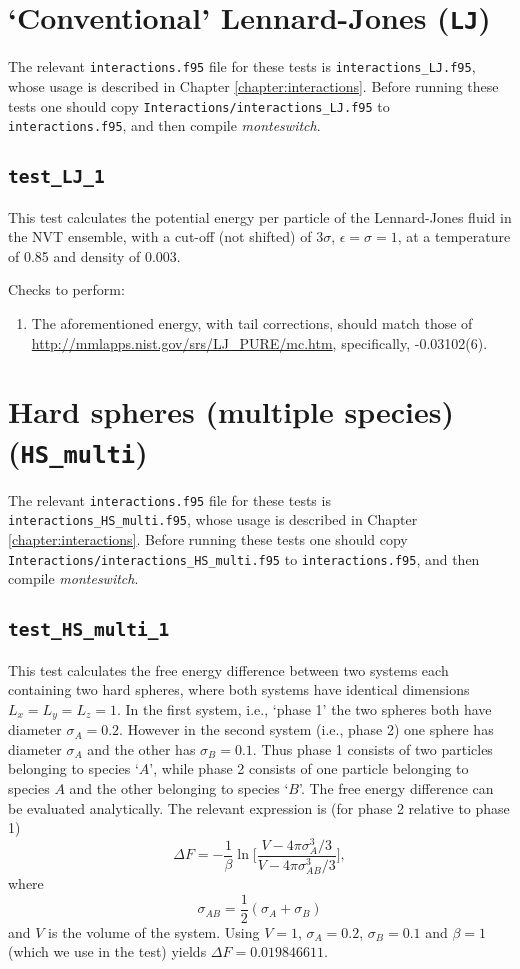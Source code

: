 \documentclass{report}
\begin{document}
\section{`Conventional' Lennard-Jones (\texttt{LJ})}
The relevant \texttt{interactions.f95} file for these tests is \texttt{interactions\_LJ.f95}, whose usage is described in Chapter
\ref{chapter:interactions}. Before running these tests one should copy \texttt{Interactions/interactions\_LJ.f95}
to \texttt{interactions.f95}, and then compile \emph{monteswitch}.


\subsection{\texttt{test\_LJ\_1}}
This test calculates the potential energy per particle of the Lennard-Jones fluid in the NVT ensemble, with a cut-off (not shifted) of
$3\sigma$, $\epsilon=\sigma=1$, at a temperature of 0.85 and density of 0.003.

Checks to perform:
\begin{enumerate}
\item
The aforementioned energy, with tail corrections, should match those of \url{http://mmlapps.nist.gov/srs/LJ_PURE/mc.htm},
specifically, -0.03102(6).
\end{enumerate}


\section{Hard spheres (multiple species) (\texttt{HS\_multi})}
The relevant \texttt{interactions.f95} file for these tests is \texttt{interactions\_HS\_multi.f95}, whose usage is described in Chapter
\ref{chapter:interactions}. Before running these tests one should copy \texttt{Interactions/interactions\_HS\_multi.f95}
to \texttt{interactions.f95}, and then compile \emph{monteswitch}.

\subsection{\texttt{test\_HS\_multi\_1}}
This test calculates the free energy difference between two systems each containing two hard spheres, where both systems have identical dimensions
$L_x=L_y=L_z=1$. In the first system, i.e., `phase 1' the two spheres both have diameter $\sigma_A=0.2$. However in the second system (i.e., phase 2) 
one sphere has diameter $\sigma_A$ and the other has $\sigma_B=0.1$. Thus phase 1 consists of two particles belonging to species `$A$', while phase 2
consists of one particle belonging to species $A$ and the other belonging to species `$B$'.
The free energy difference can be evaluated analytically. The relevant expression is (for phase 2 relative to phase 1)
\begin{equation}
\Delta F=-\frac{1}{\beta}\ln\Biggl[\frac{V-4\pi\sigma_A^3/3}{V-4\pi\sigma_{AB}^3/3}\Biggr],
\end{equation}
where
\begin{equation}
\sigma_{AB}=\frac{1}{2}(\sigma_A+\sigma_B)
\end{equation}
and $V$ is the volume of the system. Using $V=1$, $\sigma_A=0.2$, $\sigma_B=0.1$ and $\beta=1$ (which we use in the test) yields 
$\Delta F=0.019846611$. 
\end{document}
